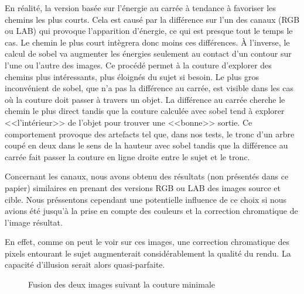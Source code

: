 \documentclass[a4paper]{article}
\begin{document}
En réalité, la version basée sur l'énergie au carrée à tendance à favoriser les chemins les plus courts.
Cela est causé par la différence sur l'un des canaux (RGB ou LAB) qui provoque l'apparition d'énergie, ce qui
est presque tout le temps le cas. Le chemin le plus court intègrera donc moins ces différences. 
À l'inverse, le calcul de sobel va augmenter les énergies seulement au contact d'un contour sur l'une ou
l'autre des images. Ce procédé permet à la couture d'explorer des chemins plus intéressants,
plus éloignés du sujet si besoin. 
Le plus gros inconvénient de sobel, que n'a pas la différence au carrée, est visible dans les cas où la couture doit
passer à travers un objet. La différence au carrée cherche le chemin le plus direct tandis que la couture
calculée avec sobel tend à explorer <<l'intérieur>> de l'objet pour trouver une <<bonne>> sortie.
Ce comportement provoque des artefacts tel que, dans nos tests, le tronc d'un arbre coupé en deux dans le sens
de la hauteur avec sobel tandis que la différence au carrée fait passer la couture en ligne droite entre le sujet et le
tronc.

Concernant les canaux, nous avons obtenu des résultats (non présentés dans ce papier) similaires en prenant des versions RGB
ou LAB des images source et cible. Nous préssentons cependant une potentielle influence de ce choix si nous
avions été jusqu'à la prise en compte des couleurs et la correction chromatique de l'image résultat.

En effet, comme on peut le voir sur ces images, une correction chromatique des pixels entourant le sujet augmenterait considérablement la qualité du rendu. La capacité  d'illusion serait alors quasi-parfaite.

\begin{figure}[!ht]%
    \centering
    \hspace{0.030\textwidth}
    \caption{Fusion des deux images suivant la couture minimale}
    \label{resultsA}
\end{figure}
\end{document}
